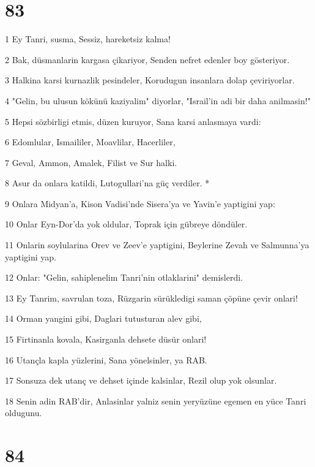 \chapter{83}

\par 1 Ey Tanri, susma, Sessiz, hareketsiz kalma!
\par 2 Bak, düsmanlarin kargasa çikariyor, Senden nefret edenler boy gösteriyor.
\par 3 Halkina karsi kurnazlik pesindeler, Korudugun insanlara dolap çeviriyorlar.
\par 4 "Gelin, bu ulusun kökünü kaziyalim" diyorlar, "Israil'in adi bir daha anilmasin!"
\par 5 Hepsi sözbirligi etmis, düzen kuruyor, Sana karsi anlasmaya vardi:
\par 6 Edomlular, Ismaililer, Moavlilar, Hacerliler,
\par 7 Geval, Ammon, Amalek, Filist ve Sur halki.
\par 8 Asur da onlara katildi, Lutogullari'na güç verdiler. *
\par 9 Onlara Midyan'a, Kison Vadisi'nde Sisera'ya ve Yavin'e yaptigini yap:
\par 10 Onlar Eyn-Dor'da yok oldular, Toprak için gübreye döndüler.
\par 11 Onlarin soylularina Orev ve Zeev'e yaptigini, Beylerine Zevah ve Salmunna'ya yaptigini yap.
\par 12 Onlar: "Gelin, sahiplenelim Tanri'nin otlaklarini" demislerdi.
\par 13 Ey Tanrim, savrulan toza, Rüzgarin sürükledigi saman çöpüne çevir onlari!
\par 14 Orman yangini gibi, Daglari tutusturan alev gibi,
\par 15 Firtinanla kovala, Kasirganla dehsete düsür onlari!
\par 16 Utançla kapla yüzlerini, Sana yönelsinler, ya RAB.
\par 17 Sonsuza dek utanç ve dehset içinde kalsinlar, Rezil olup yok olsunlar.
\par 18 Senin adin RAB'dir, Anlasinlar yalniz senin yeryüzüne egemen en yüce Tanri oldugunu.

\chapter{84}

